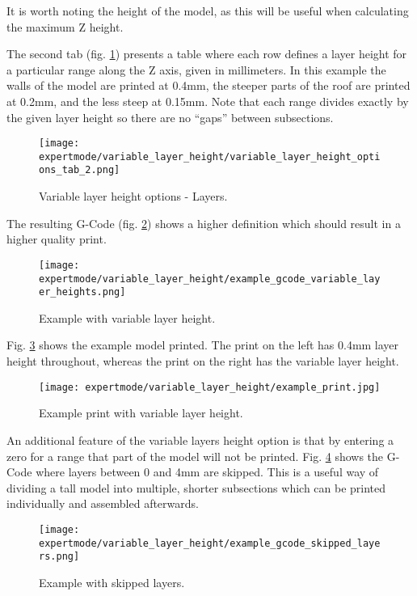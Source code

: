 It is worth noting the height of the model, as this will be useful when calculating the maximum Z height.

The second tab (fig. \ref{fig:variable_layer_height_options_tab_2}) presents a table where each row defines a layer height for a particular range along the Z axis, given in millimeters.  In this example the walls of the model are printed at 0.4mm, the steeper parts of the roof are printed at 0.2mm, and the less steep at 0.15mm.  Note that each range divides exactly by the given layer height so there are no ``gaps'' between subsections.

\begin{figure}[H]
\centering
\texttt{[image: expertmode/variable\_layer\_height/variable\_layer\_height\_options\_tab\_2.png]}
\caption{Variable layer height options - Layers.}
\label{fig:variable_layer_height_options_tab_2}
\end{figure}

The resulting G-Code (fig. \ref{fig:example_gcode_variable_layer_heights}) shows a higher definition which should result in a higher quality print.

\begin{figure}[H]
\centering
\texttt{[image: expertmode/variable\_layer\_height/example\_gcode\_variable\_layer\_heights.png]}
\caption{Example with variable layer height.}
\label{fig:example_gcode_variable_layer_heights}
\end{figure}

Fig. \ref{fig:example_print} shows the example model printed.  The print on the left has 0.4mm layer height throughout, whereas the print on the right has the variable layer height.

\begin{figure}[H]
\centering
\texttt{[image: expertmode/variable\_layer\_height/example\_print.jpg]}
\caption{Example print with variable layer height.}
\label{fig:example_print}
\end{figure}

An additional feature of the variable layers height option is that by entering a zero for a range that part of the model will not be printed.  Fig. \ref{fig:example_gcode_skipped_layers} shows the G-Code where layers between 0 and 4mm are skipped.  This is a useful way of dividing a tall model into multiple, shorter subsections which can be printed individually and assembled afterwards.
\begin{figure}[H]
\centering
\texttt{[image: expertmode/variable\_layer\_height/example\_gcode\_skipped\_layers.png]}
\caption{Example with skipped layers.}
\label{fig:example_gcode_skipped_layers}
\end{figure}

